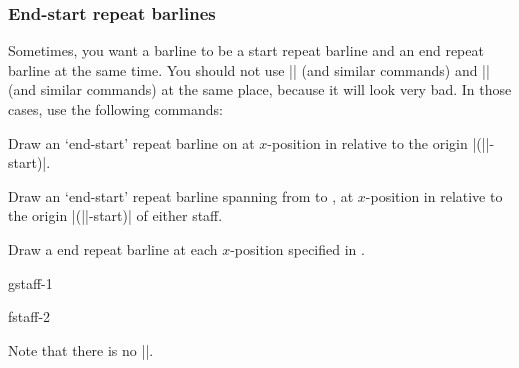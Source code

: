 \subsubsection{End-start repeat barlines}\label{sec:multistaff:barlines:endstart}
Sometimes, you want a barline to be a start repeat barline and an end repeat 
barline at the same time. You should not use |\tmstartrepeatbarline| (and 
similar commands) and |\tmendrepeatbarline| (and similar commands) at the 
same place, because it will look very bad. In those cases, use the following 
commands:
\begin{command}{\tmendstartrepeatbarline{}}
  Draw an `end-start' repeat barline on  at $x$-position 
   in relative to the origin |(||-start)|.
\end{command}
\begin{command}{\tmendstartrepeatbarline*{}}
  Draw an `end-start' repeat barline spanning from  to 
  , at $x$-position  in relative to 
  the origin |(||-start)| of either staff.
\end{command}
\begin{command}{\tmendstartrepeatbarlineinline{}}
  Draw a end repeat barline at each $x$-position specified in .
\end{command}
\begin{codeexample}[]
\begin{tmline}%
\begin{tmstaff}{g}{staff-1}\end{tmstaff}%
\begin{tmstaff}{f}{staff-2}
\end{tmstaff}%
%
%
%
\end{tmline}
\end{codeexample}
Note that there is no |\tmendstartrepeatbarlineendline|.
